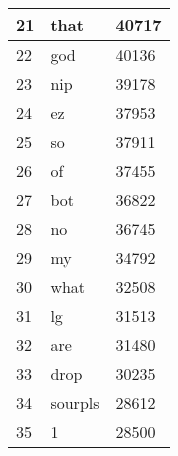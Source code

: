 \documentclass[final]{report}
\begin{document}
\begin{table}[]
\begin{tabular}{l|l|l|}
\multicolumn{1}{|l|}{21} & that         & 40717     \\ \hline
\multicolumn{1}{|l|}{22} & god          & 40136     \\ \hline
\multicolumn{1}{|l|}{23} & nip          & 39178     \\ \hline
\multicolumn{1}{|l|}{24} & ez           & 37953     \\ \hline
\multicolumn{1}{|l|}{25} & so           & 37911     \\ \hline
\multicolumn{1}{|l|}{26} & of           & 37455     \\ \hline
\multicolumn{1}{|l|}{27} & bot          & 36822     \\ \hline
\multicolumn{1}{|l|}{28} & no           & 36745     \\ \hline
\multicolumn{1}{|l|}{29} & my           & 34792     \\ \hline
\multicolumn{1}{|l|}{30} & what         & 32508     \\ \hline
\multicolumn{1}{|l|}{31} & lg           & 31513     \\ \hline
\multicolumn{1}{|l|}{32} & are          & 31480     \\ \hline
\multicolumn{1}{|l|}{33} & drop         & 30235     \\ \hline
\multicolumn{1}{|l|}{34} & sourpls      & 28612     \\ \hline
\multicolumn{1}{|l|}{35} & 1            & 28500     \\ \hline
\end{tabular}
\end{table}
\end{document}
